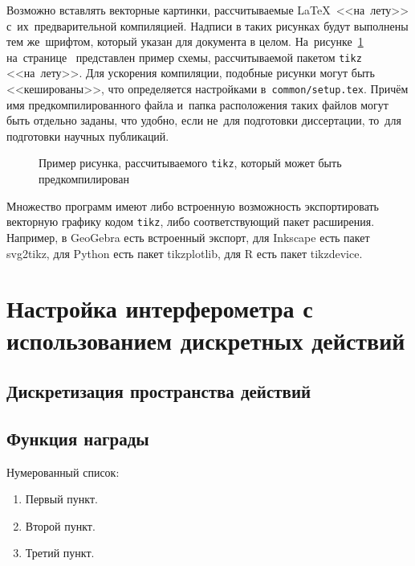 Возможно вставлять векторные картинки, рассчитываемые \LaTeX\ <<на~лету>>
с~их~предварительной компиляцией. Надписи в таких рисунках будут выполнены
тем же~шрифтом, который указан для документа в целом.
На~рисунке~\cref{fig:tikz_example} на~странице~\pageref{fig:tikz_example}
представлен пример схемы, рассчитываемой пакетом \verb|tikz| <<на~лету>>.
Для ускорения компиляции, подобные рисунки могут быть <<кешированы>>, что
определяется настройками в~\verb|common/setup.tex|.
Причём имя предкомпилированного
файла и~папка расположения таких файлов могут быть отдельно заданы,
что удобно, если не~для подготовки диссертации,
то~для подготовки научных публикаций.
\begin{figure}[ht]
    \legend{}
    \caption[Пример \texttt{tikz} схемы]{Пример рисунка, рассчитываемого
        \texttt{tikz}, который может быть предкомпилирован}\label{fig:tikz_example}
\end{figure}

Множество программ имеют либо встроенную возможность экспортировать векторную
графику кодом \verb|tikz|, либо соответствующий пакет расширения.
Например, в GeoGebra есть встроенный экспорт,
для Inkscape есть пакет svg2tikz,
для Python есть пакет tikzplotlib,
для R есть пакет tikzdevice.

\section{Настройка интерферометра с использованием дискретных действий}\label{sec:ch2/sec3}

\subsection{Дискретизация пространства действий}
\subsection{Функция награды}

\noindent Нумерованный список:
\begin{enumerate}
    \item Первый пункт.
    \item Второй пункт.
    \item Третий пункт.
\end{enumerate}

